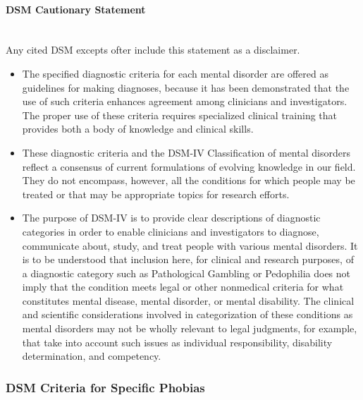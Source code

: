 \documentclass[a4paper,10pt,twoside]{article}
\begin{document}
\paragraph{DSM Cautionary Statement}  ~\\
Any cited DSM excepts ofter include this statement as a disclaimer. \cite{dsmCaution}
\begin{itemize}

\item The specified diagnostic criteria for each mental disorder are offered as guidelines for making diagnoses, because it has been demonstrated that 
the use of such criteria enhances agreement among clinicians and investigators. The proper use of these criteria requires specialized clinical
training that provides both a body of knowledge and clinical skills. 

\item These diagnostic criteria and the DSM-IV Classification of mental disorders reflect a consensus of current formulations of evolving knowledge in
our field. They do not encompass, however, all the conditions for which people may be treated or that may be appropriate topics for research efforts. 

\item The purpose of DSM-IV is to provide clear descriptions of diagnostic categories in order to enable clinicians and investigators to diagnose, communicate
about, study, and treat people with various mental disorders. It is to be understood that inclusion here, for clinical and research purposes, of a diagnostic
category such as Pathological Gambling or Pedophilia does not imply that the condition meets legal or other nonmedical criteria for what constitutes mental disease,
mental disorder, or mental disability. The clinical and scientific considerations involved in categorization of these conditions as mental disorders may not be wholly 
relevant to legal judgments, for example, that take into account such issues as individual responsibility, disability determination, and competency.
\end{itemize}
\pagebreak
\subsubsection{DSM Criteria for Specific Phobias}
\end{document}
